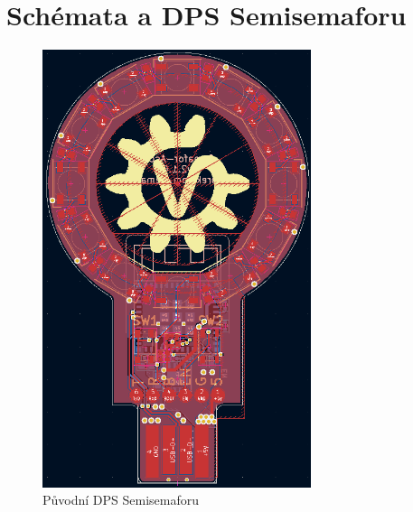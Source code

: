 \chapter{Schémata a DPS Semisemaforu}

\begin{figure}[!h]
	\begin{center}
	  \includegraphics[width=0.7\textwidth]{text/PraktickaCast/img/Semisemafor-PCB-V1.png}
	\end{center}
	\label{Semisemafor-pcb-v1}
	  \caption{Původní DPS Semisemaforu}
\end{figure}
  
